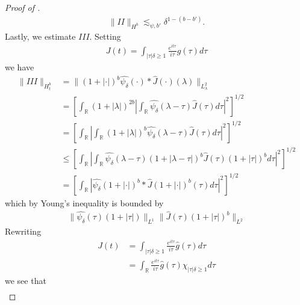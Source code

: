 \documentclass[12pt,reqno]{amsart}
\numberwithin{equation}{section}  %
\renewcommand{\cref}{\Cref}
\newcommand{\rr}{\mathbb{R}}
\newcommand{\wh}{\widehat}
\begin{document}
\begin{appendices}
\begin{proof}[Proof of \cref{lem:pre-bilin-est}]
\begin{equation}
\begin{split}
  \| II \|_{H^{b}} \lesssim_{\psi, b'} \delta^{1 - (b - b')}.
\end{split}
\end{equation}
%
%
Lastly, we estimate $III$. Setting 
%
%
\begin{equation*}
\begin{split}
J(t) = \int_{| \tau |\delta \ge 1}
  \frac{e^{it \tau}}{i \tau}\wh{g}(\tau) d \tau
\end{split}
\end{equation*}
%
%
we have
%
%
\begin{equation*}
\begin{split}
  \| III \|_{H^{b}_{t}}
  & = \| (1 + | \cdot |)^{b} \wh{\psi_{\delta}}(\cdot) *
  \wh{J}(\cdot) (\lambda) \|_{L^{2}_{\lambda}}
  \\
  & = \left[ \int_{\rr} (1 + | \lambda |)^{2b} | \int_{\rr}
  \wh{\psi_{\delta}}(\lambda - \tau) \wh{J}(\tau) d \tau |^{2} \right]^{1/2}
  \\
  & = \left[ \int_{\rr}  | \int_{\rr}
 (1 + | \lambda |)^{b} \wh{\psi_{\delta}}(\lambda - \tau) \wh{J}(\tau) d \tau |^{2} \right]^{1/2}
  \\
  & \le \left[ \int_{\rr}  | \int_{\rr}
  \wh{\psi_{\delta}}(\lambda - \tau) (1 + | \lambda - \tau |)^{b} \wh{J}(\tau)
  (1 + | \tau |)^{b}  d \tau |^{2} \right]^{1/2}
  \\
  & = \left[ \int_{\rr} | \wh{\psi_{\delta}}(1 + | \cdot |)^{b} * \wh{J}(1 + | \cdot
  |)^{b} (\tau) d \tau |^{2}  \right]^{1/2}
\end{split}
\end{equation*}
%
%
which by Young's inequality is bounded by
%
%
\begin{equation*}
\begin{split}
  \| \wh{\psi_{\delta}}(\tau) (1 + | \tau |) \|_{L^{1}} \| \wh{J}(\tau) (1 + | \tau
  |)^{b} \|_{L^{2}}
\end{split}
\end{equation*}
%
%
Rewriting
%
%
\begin{equation*}
\begin{split}
  J(t) 
  & = \int_{| \tau |\delta \ge 1}
  \frac{e^{it \tau}}{i \tau}\wh{g}(\tau) d \tau
  \\
  & = \int_{\rr}
  \frac{e^{it \tau}}{i \tau}\wh{g}(\tau) \chi_{| \tau |\delta \ge 1} d \tau
\end{split}
\end{equation*}
%
%
we see that
%
%
\begin{equation*}
\begin{split}

\end{split}
\end{equation*}
\end{proof}
\end{appendices}
\end{document}
